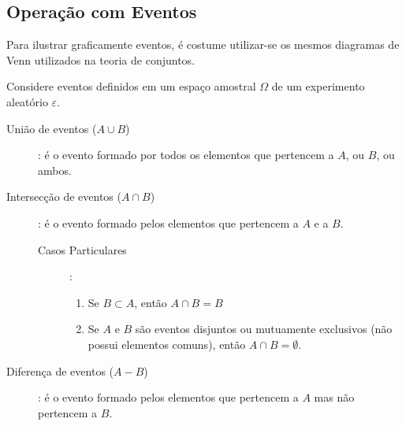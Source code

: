 \documentclass[11pt,a4paper]{book}
\begin{document}
\subsection{Operação com Eventos}
Para ilustrar graficamente eventos, é costume utilizar-se os mesmos diagramas de Venn utilizados na teoria de conjuntos.

Considere eventos definidos em um espaço amostral $\Omega$ de um experimento aleatório $\varepsilon$.

\begin{description}
  \item [União de eventos ($A \cup B$)]: é o evento formado por todos os elementos que pertencem a $A$, ou  $B$, ou ambos.
   \begin{figure}[H]
     \centering
     
       \caption{}
       \label{fig:1}
     \end{figure} 
  \item [Intersecção de eventos ($A \cap B$)]: é o evento formado pelos elementos que pertencem a $A$ e a $B$.
    \begin{figure}[H]
      \centering
      
      \caption{}
      \label{fig:2}
    \end{figure} 
    \begin{description}
      \item[Casos Particulares]:
    \begin{enumerate}
      \item Se $B \subset A$, então $A \cap B= B$ 

        \begin{figure}[H]
          \centering
      
          \caption{}
          \label{fig:3}
        \end{figure}

      \item Se $A$ e $B$ são eventos disjuntos ou mutuamente exclusivos (não possui elementos comuns), então $A\cap B = \emptyset$.

        \begin{figure}[H]
          \centering
      
          \caption{}
          \label{fig:4}
        \end{figure}

    \end{enumerate}
  \end{description}
  \item[Diferença de eventos ($A-B$)]: é o evento formado pelos elementos que pertencem a $A$ mas não pertencem a $B$.


\end{description}
\end{document}
